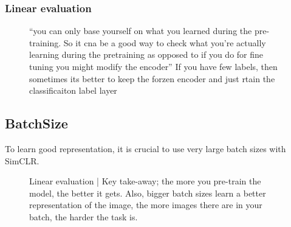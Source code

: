 \documentclass[11pt]{article}
\begin{document}
\subsubsection{Linear evaluation}

\begin{figure}[H]
    \centering
    \caption*{``you can only base yourself on what you learned during the pre-training. So it cna be a good way to check what you're actually learning during the pretraining as opposed to if you do for fine tuning you might modify the encoder'' If you have few labels, then sometimes its better to keep the forzen encoder and just rtain the classificaiton label layer}
\end{figure}

\subsection{BatchSize}

To learn good representation, it is crucial to use very large batch sizes with SimCLR.

\begin{figure}[H]
    \centering
    \caption*{Linear evaluation | Key take-away; the more you pre-train the model, the better it gets. Also, bigger batch sizes learn a better representation of the image, the more images there are in your batch, the harder the task is.}
\end{figure}
\end{document}

